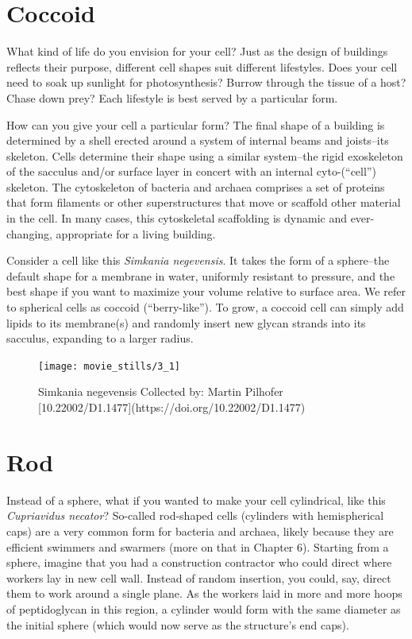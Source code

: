 \documentclass[]{tufte-book}
\begin{document}
\section{Coccoid}\label{coccoid}

What kind of life do you envision for your cell? Just as the design of
buildings reflects their purpose, different cell shapes suit different
lifestyles. Does your cell need to soak up sunlight for photosynthesis?
Burrow through the tissue of a host? Chase down prey? Each lifestyle is
best served by a particular form.

How can you give your cell a particular form? The final shape of a
building is determined by a shell erected around a system of internal
beams and joists--its skeleton. Cells determine their shape using a
similar system--the rigid exoskeleton of the sacculus and/or surface
layer in concert with an internal cyto-(``cell'') skeleton. The
cytoskeleton of bacteria and archaea comprises a set of proteins that
form filaments or other superstructures that move or scaffold other
material in the cell. In many cases, this cytoskeletal scaffolding is
dynamic and ever-changing, appropriate for a living building.

Consider a cell like this \emph{Simkania negevensis}. It takes the form
of a sphere--the default shape for a membrane in water, uniformly
resistant to pressure, and the best shape if you want to maximize your
volume relative to surface area. We refer to spherical cells as coccoid
(``berry-like''). To grow, a coccoid cell can simply add lipids to its
membrane(s) and randomly insert new glycan strands into its sacculus,
expanding to a larger radius.

\begin{figure}
\texttt{[image: movie\_stills/3\_1]} \caption[Simkania negevensis Collected by]{Simkania negevensis Collected by: Martin Pilhofer [10.22002/D1.1477](https://doi.org/10.22002/D1.1477)}\label{fig:unnamed-chunk-45}
\end{figure}

\section{Rod}\label{rod}

Instead of a sphere, what if you wanted to make your cell cylindrical,
like this \emph{Cupriavidus necator}? So-called rod-shaped cells
(cylinders with hemispherical caps) are a very common form for bacteria
and archaea, likely because they are efficient swimmers and swarmers
(more on that in Chapter 6). Starting from a sphere, imagine that you
had a construction contractor who could direct where workers lay in new
cell wall. Instead of random insertion, you could, say, direct them to
work around a single plane. As the workers laid in more and more hoops
of peptidoglycan in this region, a cylinder would form with the same
diameter as the initial sphere (which would now serve as the structure's
end caps).
\end{document}
